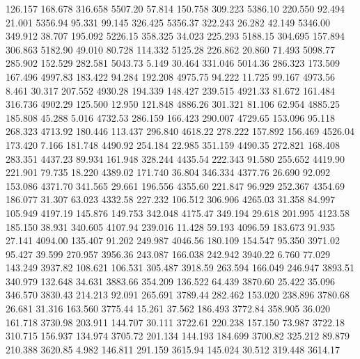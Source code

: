  126.157  168.678  316.658      5507.20
  57.814  150.758  309.223      5386.10
 220.550   92.494   21.001      5356.94
  95.331   99.145  326.425      5356.37
 322.243   26.282   42.149      5346.00
 349.912   38.707  195.092      5226.15
 358.325   34.023  225.293      5188.15
 304.695  157.894  306.863      5182.90
  49.010   80.728  114.332      5125.28
 226.862   20.860   71.493      5098.77
 285.902  152.529  282.581      5043.73
   5.149   30.464  331.046      5014.36
 286.323  173.509  167.496      4997.83
 183.422   94.284  192.208      4975.75
  94.222   11.725   99.167      4973.56
   8.461   30.317  207.552      4930.28
 194.339  148.427  239.515      4921.33
  81.672  161.484  316.736      4902.29
 125.500   12.950  121.848      4886.26
 301.321   81.106   62.954      4885.25
 185.808   45.288    5.016      4732.53
 286.159  166.423  290.007      4729.65
 153.096   95.118  268.323      4713.92
 180.446  113.437  296.840      4618.22
 278.222  157.892  156.469      4526.04
 173.420    7.166  181.748      4490.92
 254.184   22.985  351.159      4490.35
 272.821  168.408  283.351      4437.23
  89.934  161.948  328.244      4435.54
 222.343   91.580  255.652      4419.90
 221.901   79.735   18.220      4389.02
 171.740   36.804  346.334      4377.76
  26.690   92.092  153.086      4371.70
 341.565   29.661  196.556      4355.60
 221.847   96.929  252.367      4354.69
 186.077   31.307   63.023      4332.58
 227.232  106.512  306.906      4265.03
  31.358   84.997  105.949      4197.19
 145.876  149.753  342.048      4175.47
 349.194   29.618  201.995      4123.58
 185.150   38.931  340.605      4107.94
 239.016   11.428   59.193      4096.59
 183.673   91.935   27.141      4094.00
 135.407   91.202  249.987      4046.56
 180.109  154.547   95.350      3971.02
  95.427   39.599  270.957      3956.36
 243.087  166.038  242.942      3940.22
   6.760   77.029  143.249      3937.82
 108.621  106.531  305.487      3918.59
 263.594  166.049  246.947      3893.51
 340.979  132.648   34.631      3883.66
 354.209  136.522   64.439      3870.60
  25.422   35.096  346.570      3830.43
 214.213   92.091  265.691      3789.44
 282.462  153.020  238.896      3780.68
  26.681   31.316  163.560      3775.44
  15.261   37.562  186.493      3772.84
 358.905   36.020  161.718      3730.98
 203.911  144.707   30.111      3722.61
 220.238  157.150   73.987      3722.18
 310.715  156.937  134.974      3705.72
 201.134  144.193  184.699      3700.82
 325.212   89.879  210.388      3620.85
   4.982  146.811  291.159      3615.94
 145.024   30.512  319.448      3614.17
